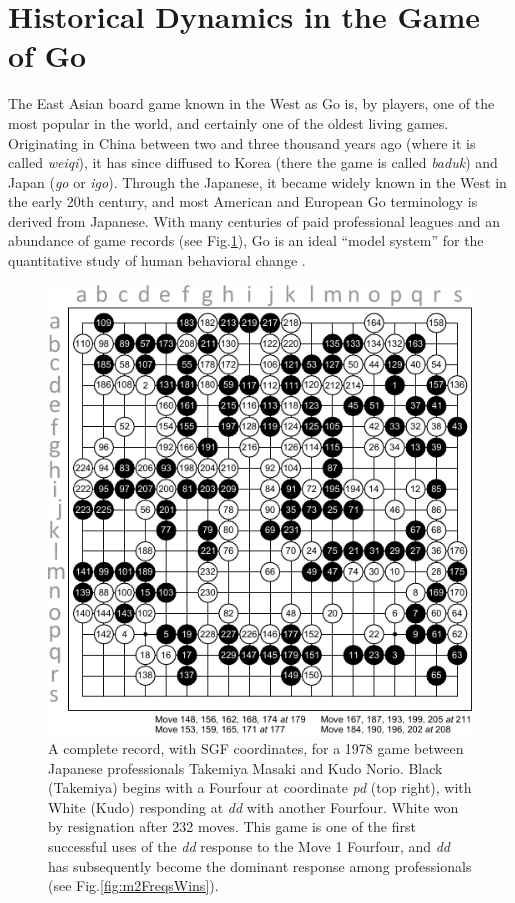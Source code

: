 \documentclass[reqno,12pt]{amsart}
\begin{document}
\section{Historical Dynamics in the Game of Go}

The East Asian board game known in the West as Go is, by players, one of the most popular in the world, and certainly one of the oldest living games. Originating in China between two and three thousand years ago (where it is called \textit{weiqi}), it has since diffused to Korea (there the game is called \textit{baduk}) and Japan (\textit{go} or \textit{igo}). Through the Japanese, it became widely known in the West in the early 20th century, and most American and European Go terminology is derived from Japanese. With many centuries of paid professional leagues and an abundance of game records (see Fig.\;\ref{fig:kifu}), Go is an ideal ``model system'' for the quantitative study of human behavioral change \citep{gobet2004moves}.

\begin{figure}[t]
  \begin{center}
    \includegraphics[scale=1.3]{./assets/kifu.pdf}
    \caption{A complete record, with SGF coordinates, for a 1978 game between Japanese professionals Takemiya Masaki and Kudo Norio. Black (Takemiya) begins with a Fourfour at coordinate \textit{pd} (top right), with White (Kudo) responding at \textit{dd} with another Fourfour. White won by resignation after 232 moves. This game is one of the first successful uses of the \textit{dd} response to the Move 1 Fourfour, and \textit{dd} has subsequently become the dominant response among professionals (see Fig.\;\ref{fig:m2FreqsWins}).}
    \label{fig:kifu}
  \end{center}
\end{figure}
\end{document}
